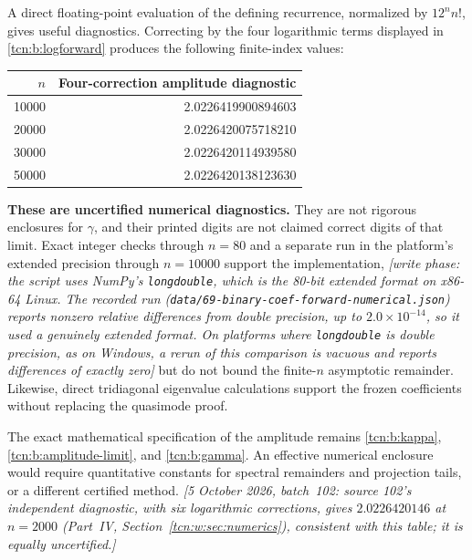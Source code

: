 \documentclass[11pt,letterpaper]{article}
\theoremstyle{remark}
\begin{document}
A direct floating-point evaluation of the defining recurrence, normalized by $12^n n!$, gives useful diagnostics. Correcting by the four logarithmic terms displayed in \eqref{tcn:b:logforward} produces the following finite-index values:
\begin{center}
\begin{tabular}{rr}
\toprule
$n$ & Four-correction amplitude diagnostic\\
\midrule
10000 & 2.0226419900894603\\
20000 & 2.0226420075718210\\
30000 & 2.0226420114939580\\
50000 & 2.0226420138123630\\
\bottomrule
\end{tabular}
\end{center}
\textbf{These are uncertified numerical diagnostics.} They are not rigorous enclosures for $\gamma$, and their printed digits are not claimed correct digits of that limit. Exact integer checks through $n=80$ and a separate run in the platform's extended precision through $n=10000$ support the implementation, \emph{[write phase: the script uses NumPy's \texttt{longdouble}, which is the 80-bit extended format on x86-64 Linux. The recorded run (\textup{\nolinkurl{data/69-binary-coef-forward-numerical.json}}) reports nonzero relative differences from double precision, up to $2.0\times10^{-14}$, so it used a genuinely extended format. On platforms where \texttt{longdouble} is double precision, as on Windows, a rerun of this comparison is vacuous and reports differences of exactly zero]} but do not bound the finite-$n$ asymptotic remainder. Likewise, direct tridiagonal eigenvalue calculations support the frozen coefficients without replacing the quasimode proof.

The exact mathematical specification of the amplitude remains \eqref{tcn:b:kappa}, \eqref{tcn:b:amplitude-limit}, and \eqref{tcn:b:gamma}. An effective numerical enclosure would require quantitative constants for spectral remainders and projection tails, or a different certified method.
\emph{[5 October 2026, batch~102: source 102's independent diagnostic, with six logarithmic corrections, gives $2.0226420146$ at $n=2000$ (Part~IV, Section~\ref{tcn:w:sec:numerics}), consistent with this table; it is equally uncertified.]}
\end{document}
